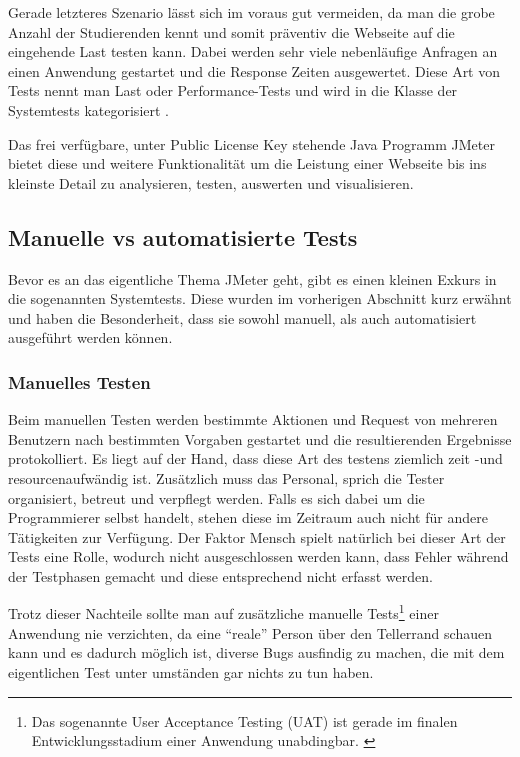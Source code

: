 \documentclass[a4paper,12pt]{article}
\begin{document}
Gerade letzteres Szenario lässt sich im voraus gut vermeiden, da man die grobe Anzahl der Studierenden kennt und somit präventiv die Webseite auf die eingehende Last testen kann. Dabei werden sehr viele nebenläufige Anfragen an einen Anwendung gestartet und die Response Zeiten ausgewertet. Diese Art von Tests nennt man Last oder Performance-Tests und wird in die Klasse der Systemtests kategorisiert \cite{online:LastUndPerformanceTest}. 

Das frei verfügbare, unter Public License Key stehende Java Programm JMeter bietet diese und weitere Funktionalität um die Leistung einer Webseite bis ins kleinste Detail zu analysieren, testen, auswerten und visualisieren.

\subsection{Manuelle vs automatisierte Tests}
Bevor es an das eigentliche Thema JMeter geht, gibt es einen kleinen Exkurs in die sogenannten Systemtests. Diese wurden im vorherigen Abschnitt kurz erwähnt und haben die Besonderheit, dass sie sowohl manuell, als auch automatisiert ausgeführt werden können. 

\subsubsection{Manuelles Testen}
Beim manuellen Testen werden bestimmte Aktionen und Request von mehreren Benutzern nach bestimmten Vorgaben gestartet und die resultierenden Ergebnisse protokolliert. Es liegt auf der Hand, dass diese Art des testens ziemlich zeit -und resourcenaufwändig ist. Zusätzlich muss das Personal, sprich die Tester organisiert, betreut und verpflegt werden. Falls es sich dabei um die Programmierer selbst handelt, stehen diese im Zeitraum auch nicht für andere Tätigkeiten zur Verfügung. Der Faktor Mensch spielt natürlich bei dieser Art der Tests eine Rolle, wodurch nicht ausgeschlossen werden kann, dass Fehler während der Testphasen gemacht und diese entsprechend nicht erfasst werden. \cite[p. 11]{book:ApacheJMeter}

Trotz dieser Nachteile sollte man auf zusätzliche manuelle Tests\footnote{Das sogenannte User Acceptance Testing (UAT) ist gerade im finalen Entwicklungsstadium einer Anwendung unabdingbar. \cite{online:wikiUAT}} einer Anwendung nie verzichten, da eine "`reale"' Person über den Tellerrand schauen kann und es dadurch möglich ist, diverse Bugs ausfindig zu machen, die mit dem eigentlichen Test unter umständen gar nichts zu tun haben.
\end{document}
